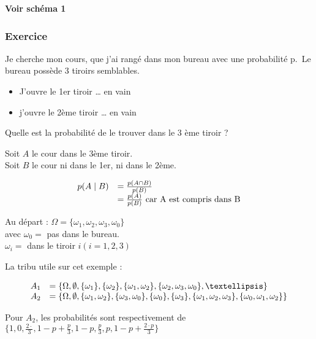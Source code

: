 \documentclass[]{article}
\begin{document}
\textbf{Voir schéma 1}

\subsubsection{Exercice}

Je cherche mon cours, que j'ai rangé dans mon bureau avec une
probabilité p.~Le bureau possède 3 tiroirs semblables.

\begin{itemize}
\itemsep1pt\parskip0pt
\item
  J'ouvre le 1er tiroir \ldots{} en vain
\item
  j'ouvre le 2ème tiroir \ldots{} en vain
\end{itemize}

Quelle est la probabilité de le trouver dans le 3 ème tiroir ?

Soit $A$ le cour dans le 3ème tiroir.\\Soit $B$ le cour ni dans le 1er,
ni dans le 2ème.

\begin{displaymath}
\begin{array}{r l}
p(A \mid B) &= \frac{p(A \cap B)}{p(B)} \\
            &= \frac{p(A)}{p(B)} \text{ car A est compris dans B}
\end{array}
\end{displaymath}

Au départ : $\Omega = \{\omega_1, \omega_2, \omega_3, \omega_0\}$\\avec
$\omega_0 =$ pas dans le bureau.\\$\omega_i =$ dans le tiroir
$i (i = 1,2,3)$

La tribu utile sur cet exemple :

\begin{displaymath}
\begin{array}{r l}
A_1 &= \{\Omega, \emptyset, \{\omega_1\}, \{\omega_2\}, \{\omega_1,\omega_2\}, \{\omega_2,\omega_3,\omega_0\},…\} \\
A_2 &= \{\Omega, \emptyset, \{\omega_1,\omega_2\}, \{\omega_3,\omega_0\},\{\omega_0\}, \{\omega_3\},\{\omega_1,\omega_2,\omega_3\},\{\omega_0,\omega_1,\omega_2\}\} \\
\end{array}
\end{displaymath}

Pour $A_2$, les probabilités sont respectivement de
$\{1,0,\frac{2\cdot}{3},1-p+\frac{p}{3},1-p,\frac{p}{3},p,1-p+\frac{2\cdot p}{3}\}$
\end{document}
